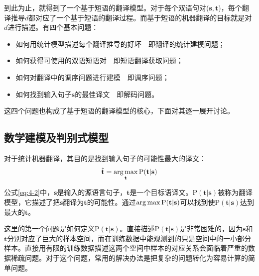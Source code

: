 \parinterval 到此为止，就得到了一个基于短语的翻译模型。对于每个双语句对($\mathbf{s}, \mathbf{t}$)，每个翻译推导$d$都对应了一个基于短语的翻译过程。而基于短语的机器翻译的目标就是对$d$进行描述。有四个基本问题：

\begin{itemize}
\vspace{0.5em}
\item 如何用统计模型描述每个翻译推导的好坏\ \dash \ 即翻译的统计建模问题；
\vspace{0.5em}
\item 如何获得可使用的双语短语对\ \dash \ 即短语翻译获取问题；
\vspace{0.5em}
\item 如何对翻译中的调序问题进行建模\ \dash \ 即调序问题；
\vspace{0.5em}
\item 如何找到输入句子$\mathbf{s}$的最佳译文\ \dash \ 即解码问题。
\vspace{0.5em}
\end{itemize}

\parinterval 这四个问题也构成了基于短语的翻译模型的核心，下面对其逐一展开讨论。


\subsection{数学建模及判别式模型}\label{subsection-4.2.2}

\parinterval 对于统计机器翻译，其目的是找到输入句子的可能性最大的译文：
\begin{eqnarray}
\hat{\mathbf{t}} = \operatorname*{arg\,max}_{\mathbf{t}} \textrm{P}(\mathbf{t}|\mathbf{s})
\label{eq:4-2}
\end{eqnarray}

\parinterval 公式\ref{eq:4-2}中，$\mathbf{s}$是输入的源语言句子，$\mathbf{t}$是一个目标语译文。$\textrm{P}(\mathbf{t}|\mathbf{s})$被称为翻译模型，它描述了把$\mathbf{s}$翻译为$\mathbf{t}$的可能性。通过$\operatorname*{arg\,max} \textrm{P}(\mathbf{t}|\mathbf{s})$可以找到使$\textrm{P}(\mathbf{t}|\mathbf{s})$达到最大的$\mathbf{t}$。

\parinterval 这里的第一个问题是如何定义$\textrm{P}(\mathbf{t}|\mathbf{s})$。直接描述$\textrm{P}(\mathbf{t}|\mathbf{s})$是非常困难的，因为$\mathbf{s}$和$\mathbf{t}$分别对应了巨大的样本空间，而在训练数据中能观测到的只是空间中的一小部分样本。直接用有限的训练数据描述这两个空间中样本的对应关系会面临着严重的数据稀疏问题。对于这个问题，常用的解决办法是把复杂的问题转化为容易计算的简单问题。

